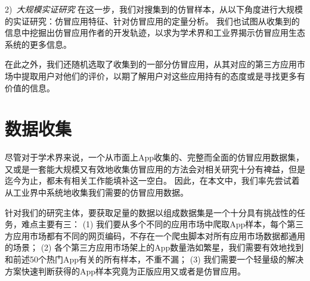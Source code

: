 2)\ \emph{大规模实证研究} \quad
在这一步，我们对搜集到的仿冒样本，从以下角度进行大规模的实证研究：仿冒应用特征、针对仿冒应用的定量分析。
我们也试图从收集到的信息中挖掘出仿冒应用作者的开发轨迹，以求为学术界和工业界揭示仿冒应用生态系统的更多信息。

在此之外，我们还随机选取了收集到的一部分仿冒应用，从其对应的第三方应用市场中提取用户对他们的评价，以期了解用户对这些应用持有的态度或是寻找更多有价值的信息。

\section{数据收集}
尽管对于学术界来说，一个从市面上App收集的、完整而全面的仿冒应用数据集，又或是一套能大规模又有效地收集仿冒应用的方法会对相关研究十分有裨益，但是迄今为止，都未有相关工作能填补这一空白。
因此，在本文中，我们率先尝试着从工业界中系统地收集我们需要的仿冒应用数据。

针对我们的研究主体，要获取足量的数据以组成数据集是一个十分具有挑战性的任务，难点主要有三：
(1) 我们要从多个不同的应用市场中爬取App样本，每个第三方应用市场都有不同的网页编码，不存在一个爬虫脚本对所有应用市场数据都通用的场景；
(2) 各个第三方应用市场架上的App数量浩如繁星，我们需要有效地找到和前述50个热门App有关的所有样本，不重不漏；
(3) 我们需要一个轻量级的解决方案快速判断获得的App样本究竟为正版应用又或者是仿冒应用。

